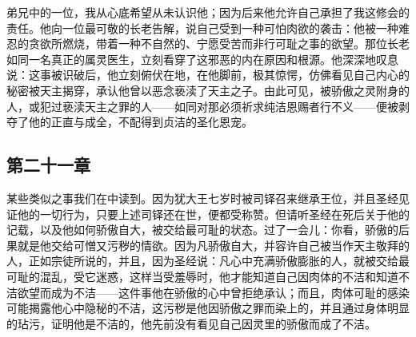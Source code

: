 弟兄中的一位，我从心底希望从未认识他；因为后来他允许自己承担了我这修会的责任。他向一位最可敬的长老告解，说自己受到一种可怕肉欲的袭击：他被一种难忍的贪欲所燃烧，带着一种不自然的、宁愿受苦而非行可耻之事的欲望。那位长老如同一名真正的属灵医生，立刻看穿了这邪恶的内在原因和根源。他深深地叹息说：这事被识破后，他立刻俯伏在地，在他脚前，极其惊愕，仿佛看见自己内心的秘密被天主揭穿，承认他曾以恶念亵渎了天主之子。由此可见，被骄傲之灵附身的人，或犯过亵渎天主之罪的人——如同对那必须祈求纯洁恩赐者行不义——便被剥夺了他的正直与成全，不配得到贞洁的圣化恩宠。\par


\subsection{第二十一章}

\par

某些类似之事我们在中读到。因为犹大王七岁时被司铎召来继承王位，并且圣经见证他的一切行为，只要上述司铎还在世，便都受称赞。但请听圣经在死后关于他的记载，以及他如何骄傲自大，被交给最可耻的状态。过了一会儿：你看，骄傲的后果就是他交给可憎又污秽的情欲。因为凡骄傲自大，并容许自己被当作天主敬拜的人，正如宗徒所说的，并且，因为圣经说：凡心中充满骄傲膨胀的人，就被交给最可耻的混乱，受它迷惑，这样当受羞辱时，他才能知道自己因肉体的不洁和知道不洁欲望而成为不洁——这件事他在骄傲的心中曾拒绝承认；而且，肉体可耻的感染可能揭露他心中隐秘的不洁，这污秽是他因骄傲之罪而染上的，并且通过身体明显的玷污，证明他是不洁的，他先前没有看见自己因灵里的骄傲而成了不洁。\par


